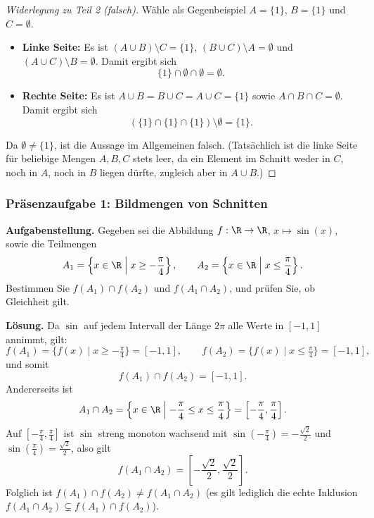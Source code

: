 \begin{proof}[Widerlegung zu Teil 2 (falsch)]
Wähle als Gegenbeispiel $A=\{1\}$, $B=\{1\}$ und $C=\emptyset$.
\begin{itemize}
    \item \textbf{Linke Seite:} Es ist $(A\cup B)\setminus C = \{1\}$, $(B\cup C)\setminus A = \emptyset$ und $(A\cup C)\setminus B = \emptyset$. Damit ergibt sich
    \[
        \{1\}\cap\emptyset\cap\emptyset = \emptyset.
    \]
    \item \textbf{Rechte Seite:} Es ist $A\cup B = B\cup C = A\cup C = \{1\}$ sowie $A\cap B\cap C = \emptyset$. Damit ergibt sich
    \[
        (\{1\}\cap\{1\}\cap\{1\})\setminus\emptyset = \{1\}.
    \]
\end{itemize}
Da $\emptyset\ne\{1\}$, ist die Aussage im Allgemeinen falsch. (Tatsächlich ist die linke Seite für beliebige Mengen $A,B,C$ stets leer, da ein Element im Schnitt weder in $C$, noch in $A$, noch in $B$ liegen dürfte, zugleich aber in $A\cup B$.)
\end{proof}

\subsubsection*{Präsenzaufgabe 1: Bildmengen von Schnitten}

\noindent\textbf{Aufgabenstellung.}
Gegeben sei die Abbildung $f:\R\to\R$, $x\mapsto\sin(x)$, sowie die Teilmengen
\[
    A_1 = \left\{x\in\R \;\middle|\; x\ge -\frac{\pi}{4}\right\},
    \qquad
    A_2 = \left\{x\in\R \;\middle|\; x\le \frac{\pi}{4}\right\}.
\]
Bestimmen Sie $f(A_1)\cap f(A_2)$ und $f(A_1\cap A_2)$, und prüfen Sie, ob Gleichheit gilt.

\medskip
\noindent\textbf{Lösung.}
Da $\sin$ auf jedem Intervall der Länge $2\pi$ alle Werte in $[-1,1]$ annimmt, gilt:
\[
    f(A_1) = \{f(x)\mid x\ge -\tfrac{\pi}{4}\} = [-1,1],
    \qquad
    f(A_2) = \{f(x)\mid x\le \tfrac{\pi}{4}\} = [-1,1],
\]
und somit
\[
    f(A_1)\cap f(A_2) = [-1,1].
\]
Andererseits ist
\[
    A_1\cap A_2 = \left\{x\in\R \;\middle|\; -\frac{\pi}{4}\le x\le\frac{\pi}{4}\right\} = \left[-\frac{\pi}{4},\frac{\pi}{4}\right].
\]
Auf $\left[-\frac{\pi}{4},\frac{\pi}{4}\right]$ ist $\sin$ streng monoton wachsend mit $\sin\left(-\frac{\pi}{4}\right)=-\frac{\sqrt{2}}{2}$ und $\sin\left(\frac{\pi}{4}\right)=\frac{\sqrt{2}}{2}$, also gilt
\[
    f(A_1\cap A_2) = \left[-\frac{\sqrt{2}}{2},\frac{\sqrt{2}}{2}\right].
\]
Folglich ist $f(A_1)\cap f(A_2)\ne f(A_1\cap A_2)$ (es gilt lediglich die echte Inklusion $f(A_1\cap A_2)\subsetneq f(A_1)\cap f(A_2)$).

